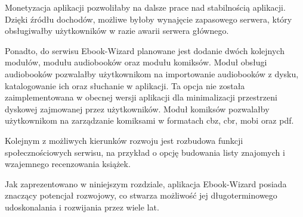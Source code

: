 Monetyzacja aplikacji pozwoliłaby na dalsze prace nad stabilnością aplikacji. Dzięki źródłu dochodów, możliwe byłoby wynajęcie zapasowego serwera, który obsługiwałby użytkowników w razie awarii serwera głównego.

Ponadto, do serwisu Ebook-Wizard planowane jest dodanie dwóch kolejnych modułów, modułu audiobooków oraz modułu komiksów. Moduł obsługi audiobooków pozwalałby użytkownikom na importowanie audiobooków z dysku, katalogowanie ich oraz słuchanie w aplikacji. Ta opcja nie została zaimplementowana w obecnej wersji aplikacji dla minimalizacji przestrzeni dyskowej zajmowanej przez użytkowników. Moduł komiksów pozwalałby użytkownikom na zarządzanie komiksami w formatach cbz, cbr, mobi oraz pdf.

Kolejnym z możliwych kierunków rozwoju jest rozbudowa funkcji społecznościowych serwisu, na przykład o opcję budowania listy znajomych i wzajemnego recenzowania książek.

Jak zaprezentowano w niniejszym rozdziale, aplikacja Ebook-Wizard posiada znaczący potencjał rozwojowy, co stwarza możliwość jej długoterminowego udoskonalania i rozwijania przez wiele lat.